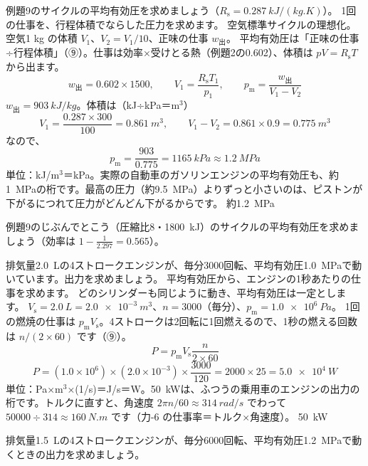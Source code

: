 \label{ph:熱-7:ex10}
\begin{phreidai}[平均有効圧]
例題9のサイクルの平均有効圧を求めましょう（$R_{\mathrm s}=\qty{0.287}{kJ/(kg.K)}$）。
\phbamen
1回の仕事を、行程体積でならした圧力を求めます。
\phmushi
空気標準サイクルの理想化。
\phzu
空気1 kg の体積 $V_1$、$V_2=V_1/10$、正味の仕事 $w_{\text{出}}$。
\phriyu
平均有効圧は「正味の仕事÷行程体積」（⑨）。仕事は効率×受けとる熱（例題2の0.602）、体積は $pV=R_{\mathrm s}T$ から出ます。
\phtateru
\[w_{\text{出}}=0.602\times1500,\qquad V_1=\frac{R_{\mathrm s}T_1}{p_1},\qquad p_{\mathrm m}=\frac{w_{\text{出}}}{V_1-V_2}\]
\phtoku
$w_{\text{出}}=\qty{903}{kJ/kg}$。体積は（kJ÷kPa＝m$^3$）
\[V_1=\frac{0.287\times300}{100}=\qty{0.861}{m^3},\qquad V_1-V_2=0.861\times0.9=\qty{0.775}{m^3}\]
なので、
\[p_{\mathrm m}=\frac{903}{0.775}=\qty{1165}{kPa}\approx\qty{1.2}{MPa}\]
\phtashikame
単位：kJ/m$^3$＝kPa。実際の自動車のガソリンエンジンの平均有効圧も、約\qty{1}{MPa}の桁です。最高の圧力（約\qty{9.5}{MPa}）よりずっと小さいのは、ピストンが下がるにつれて圧力がどんどん下がるからです。
\kotae 約\qty{1.2}{MPa}
\end{phreidai}
\begin{jibun}
例題9のじぶんでとこう（圧縮比8・\qty{1800}{kJ}）のサイクルの平均有効圧を求めましょう（効率は $1-\tfrac{1}{2.297}=0.565$）。
\end{jibun}

\label{ph:熱-7:ex11}
\begin{phreidai}[エンジンの出力]
排気量\qty{2.0}{L}の4ストロークエンジンが、毎分3000回転、平均有効圧\qty{1.0}{MPa}で動いています。出力を求めましょう。
\phbamen
平均有効圧から、エンジンの1秒あたりの仕事を求めます。
\phmushi
どのシリンダーも同じように動き、平均有効圧は一定とします。
\phzu
$V_{\mathrm s}=\qty{2.0}{L}=\qty{2.0e-3}{m^3}$、$n=3000$（毎分）、$p_{\mathrm m}=\qty{1.0e6}{Pa}$。
\phriyu
1回の燃焼の仕事は $p_{\mathrm m}V_{\mathrm s}$。4ストロークは2回転に1回燃えるので、1秒の燃える回数は $n/(2\times60)$ です（⑨）。
\phtateru
\[P=p_{\mathrm m}V_{\mathrm s}\frac{n}{2\times60}\]
\phtoku
\[P=(1.0\times10^6)\times(2.0\times10^{-3})\times\frac{3000}{120}=2000\times25=\qty{5.0e4}{W}\]
\phtashikame
単位：Pa×m$^3$×(1/s)＝J/s＝W。\qty{50}{kW}は、ふつうの乗用車のエンジンの出力の桁です。トルクに直すと、角速度 $2\pi n/60\approx\qty{314}{rad/s}$ でわって $50000\div314\approx\qty{160}{N.m}$ です（力-6 の仕事率＝トルク×角速度）。
\kotae \qty{50}{kW}
\end{phreidai}
\begin{jibun}
排気量\qty{1.5}{L}の4ストロークエンジンが、毎分6000回転、平均有効圧\qty{1.2}{MPa}で動くときの出力を求めましょう。
\end{jibun}

